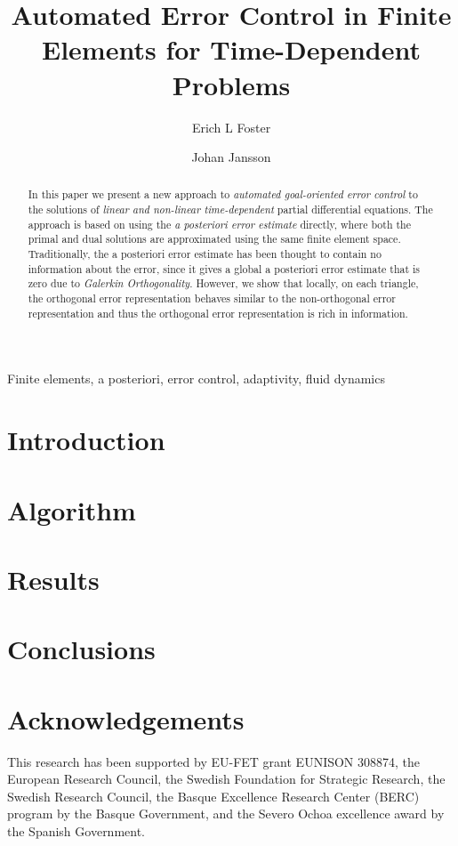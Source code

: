 \documentclass[a4paper]{article}
\author[1]{Erich L Foster}
\author[1,2]{Johan Jansson}
\affil[1]{Basque Center for Applied Mathematics, Bilbao, Basque Country -- Spain}
\affil[2]{CSC, KTH Royal Institute of Technology, Stockholm, Sweden}
\title{Automated Error Control in Finite Elements for Time-Dependent Problems}
\begin{document}
  \maketitle
  \tableofcontents
  \begin{abstract}
    In this paper we present a new approach to \emph{automated goal-oriented
    error control} to the solutions of \emph{linear and non-linear
    time-dependent} partial differential equations. The approach is based
    on using the \emph{a posteriori error estimate} directly, where both the
    primal and dual solutions are approximated using the same finite element
    space.  Traditionally, the a posteriori error estimate has been thought to
    contain no information about the error, since it gives a global a
    posteriori error estimate that is zero due to \emph{Galerkin
    Orthogonality}. However, we show that locally, on each triangle,
    the orthogonal error representation behaves similar to the
    non-orthogonal error representation and thus the orthogonal error
    representation is rich in information.
  \end{abstract}
  \begin{keywords}
    Finite elements, a posteriori, error control, adaptivity, fluid dynamics
  \end{keywords}

  \section{Introduction} \label{sec:Intro}
  

  \section{Algorithm} \label{sec:Algorithm}
  

  \section{Results} \label{sec:Results}
  

  \section{Conclusions} \label{sec:Conclusions}
  

  \section*{Acknowledgements}
  This research has been supported by EU-FET grant EUNISON 308874, the European
  Research Council, the Swedish Foundation for Strategic Research, the Swedish
  Research Council, the Basque Excellence Research Center (BERC) program by
  the Basque Government, and the Severo Ochoa excellence award by the Spanish
  Government.

  \printbibliography
\end{document}
